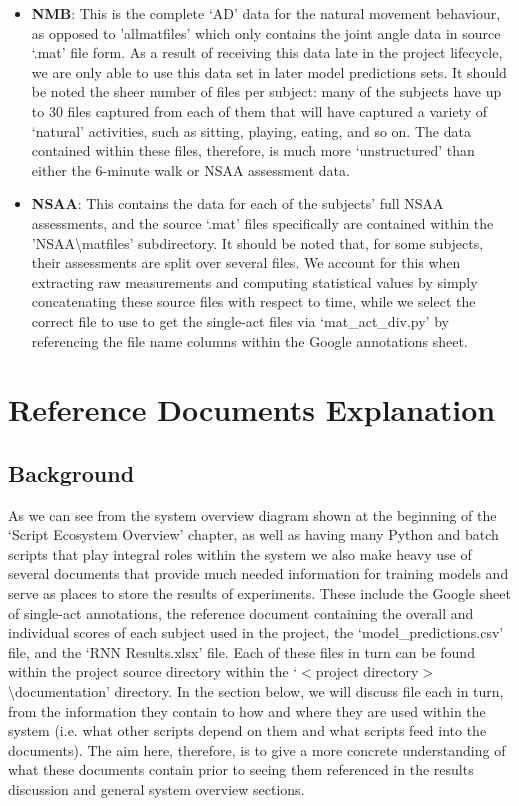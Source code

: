\documentclass[12pt,twoside]{report}
\begin{document}
\begin{itemize}
	\item \textbf{NMB}: This is the complete ‘AD’ data for the natural movement behaviour, as opposed to 'allmatfiles' which only contains the joint angle data in source ‘.mat’ file form. As a result of receiving this data late in the project lifecycle, we are only able to use this data set in later model predictions sets. It should be noted the sheer number of files per subject: many of the subjects have up to 30 files captured from each of them that will have captured a variety of ‘natural’ activities, such as sitting, playing, eating, and so on. The data contained within these files, therefore, is much more ‘unstructured’ than either the 6-minute walk or NSAA assessment data.
	\item \textbf{NSAA}: This contains the data for each of the subjects’ full NSAA assessments, and the source ‘.mat’ files specifically are contained within the 'NSAA\textbackslash matfiles' subdirectory. It should be noted that, for some subjects, their assessments are split over several files. We account for this when extracting raw measurements and computing statistical values by simply concatenating these source files with respect to time, while we select the correct file to use to get the single-act files via ‘mat\_act\_div.py’ by referencing the file name columns within the Google annotations sheet.
\end{itemize}




\chapter{Reference Documents Explanation\\}

\section{Background}

\quad As we can see from the system overview diagram shown at the beginning of the ‘Script Ecosystem Overview’ chapter, as well as having many Python and batch scripts that play integral roles within the system we also make heavy use of several documents that provide much needed information for training models and serve as places to store the results of experiments. These include the Google sheet of single-act annotations, the reference document containing the overall and individual scores of each subject used in the project, the ‘model\_predictions.csv’ file, and the ‘RNN Results.xlsx’ file. Each of these files in turn can be found within the project source directory within the ‘$<$project directory$>$\textbackslash documentation’ directory. In the section below, we will discuss file each in turn, from the information they contain to how and where they are used within the system (i.e. what other scripts depend on them and what scripts feed into the documents). The aim here, therefore, is to give a more concrete understanding of what these documents contain prior to seeing them referenced in the results discussion and general system overview sections.
\end{document}
